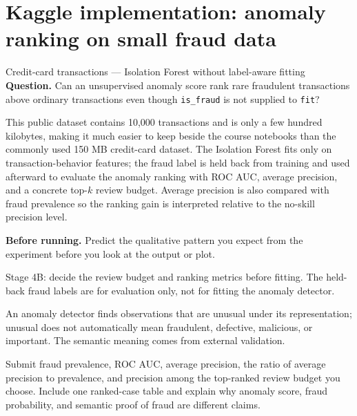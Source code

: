 \section{Kaggle implementation: anomaly ranking on small fraud data}
\label{sec:kaggle-credit-anomaly}

\begin{kaggleproject}{Credit-card transactions --- Isolation Forest without label-aware fitting}
\textbf{Question.} Can an unsupervised anomaly score rank rare fraudulent transactions above ordinary transactions even though \texttt{is\_fraud} is not supplied to \texttt{fit}?
\end{kaggleproject}

This public dataset contains 10,000 transactions and is only a few hundred kilobytes, making it much easier to keep beside the course notebooks than the commonly used 150 MB credit-card dataset. The Isolation Forest fits only on transaction-behavior features; the fraud label is held back from training and used afterward to evaluate the anomaly ranking with ROC AUC, average precision, and a concrete top-$k$ review budget. Average precision is also compared with fraud prevalence so the ranking gain is interpreted relative to the no-skill precision level.

\textbf{Before running.} Predict the qualitative pattern you expect from the experiment before you look at the output or plot.

\begin{labmode}
Stage 4B: decide the review budget and ranking metrics before fitting. The held-back fraud labels are for evaluation only, not for fitting the anomaly detector.
\end{labmode}




\begin{pitfall}
An anomaly detector finds observations that are unusual under its representation; unusual does not automatically mean fraudulent, defective, malicious, or important. The semantic meaning comes from external validation.
\end{pitfall}

\begin{labdeliverable}
Submit fraud prevalence, ROC AUC, average precision, the ratio of average precision to prevalence, and precision among the top-ranked review budget you choose. Include one ranked-case table and explain why anomaly score, fraud probability, and semantic proof of fraud are different claims.
\end{labdeliverable}
